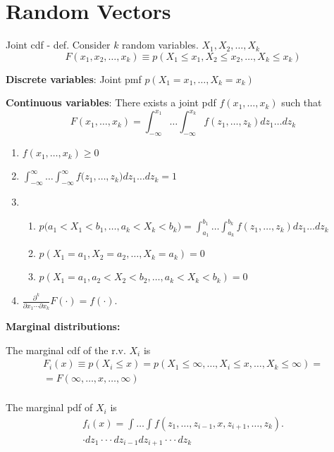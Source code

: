 \section{Random Vectors}

Joint cdf - def. Consider \(k\) random variables.
\(X_{1},X_{2},\ldots ,X_{k}\)
\[
    F (x _ {1}, x _ {2}, \ldots , x _ {k}) \equiv p (X _ {1} \leq x _ {1}, X _ {2} \leq x _ {2}, \ldots , X _ {k} \leq x _ {k})
\]

\textbf{Discrete variables}: Joint pmf \(p(X_{1} = x_{1},\ldots ,X_{k} = x_{k})\)

\textbf{Continuous variables}: There exists a joint pdf
\(f(x_{1},\ldots ,x_{k})\) such that
\[
    F (x _ {1}, \ldots , x _ {k}) = \int_ {- \infty} ^ {x _ {1}} \dots \int_ {- \infty} ^ {x _ {k}} f (z _ {1}, \ldots , z _ {k}) d z _ {1} \dots d z _ {k}
\] \begin{enumerate}
    \item   \(f(x_{1},\ldots ,x_{k})\geq 0\)
    \item   \(\int_{-\infty}^{\infty}\dots \int_{-\infty}^{\infty}f\big(z_1,\ldots ,z_k\big)dz_1\dots dz_k = 1\)
    \item    \begin{enumerate}
              \item     \(p\big(a_1 < X_1 < b_1, \ldots, a_k < X_k < b_k\big) =\int_ {a _ {1}} ^ {b _ {1}} \dots \int_ {a _ {k}} ^ {b _ {k}} f (z _ {1}, \ldots , z _ {k}) d z _ {1} \dots d z _ {k}\)
              \item   \(p(X_{1} = a_{1},X_{2} = a_{2},\ldots ,X_{k} = a_{k}) = 0\)
              \item \(p(X_{1} = a_{1},a_{2} < X_{2} < b_{2},\ldots ,a_{k} < X_{k} < b_{k}) = 0\)
          \end{enumerate}
    \item     \(\frac{\partial^k}{\partial x_1 \cdots \partial x_k} F(\cdot ) = f(\cdot )\).
\end{enumerate}

\textbf{Marginal distributions:}

The marginal cdf of the r.v. \(X_{i}\) is
\[
    \begin{array}{l} F _ {i} (x) \equiv p (X _ {i} \leq x) = p (X _ {1} \leq \infty , \ldots , X _ {i} \leq x, \ldots , X _ {k} \leq \infty) = \\ = F (\infty , \dots , x, \dots , \infty) \\ \end{array}
\]

The marginal pdf of \(X_{i}\) is
\[
    \begin{array}{l} f _ {i} (x) = \int \dots \int f \left(z _ {1}, \dots , z _ {i - 1}, x, z _ {i + 1}, \dots , z _ {k}\right). \\ \cdot d z _ {1} \cdot \cdot \cdot d z _ {i - 1} d z _ {i + 1} \cdot \cdot \cdot d z _ {k} \\ \end{array}
\]



